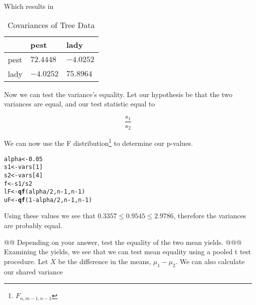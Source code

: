 \documentclass[10pt]{article}\usepackage[]{graphicx}\usepackage[]{xcolor}
\makeatletter
\newcommand{\hlnum}[1]{\textcolor[rgb]{0.686,0.059,0.569}{#1} }%
\newcommand{\hlopt}[1]{\textcolor[rgb]{0,0,0}{#1} }%
\newcommand{\hlstd}[1]{\textcolor[rgb]{0.345,0.345,0.345}{#1} }%
\newcommand{\hlkwb}[1]{\textcolor[rgb]{0.69,0.353,0.396}{#1} }%
\newcommand{\hlkwd}[1]{\textcolor[rgb]{0.737,0.353,0.396}{\textbf{#1} } }%
\newenvironment{kframe}{%
 \def\at@end@of@kframe{}%
 \ifinner\ifhmode%
  \def\at@end@of@kframe{\end{minipage} }%
  \begin{minipage}{\columnwidth}%
 \fi\fi%
 \def\FrameCommand##1{\hskip\@totalleftmargin \hskip-\fboxsep
 \colorbox{shadecolor}{##1}\hskip-\fboxsep
     \hskip-\linewidth \hskip-\@totalleftmargin \hskip\columnwidth}%
 \MakeFramed {\advance\hsize-\width
   \@totalleftmargin\z@ \linewidth\hsize
   \@setminipage} }%
 {\par\unskip\endMakeFramed%
 \at@end@of@kframe}
\newenvironment{knitrout}{}{} %
\makeatother
\begin{document}
\begin{easylist}[enumerate]
    Which results in

    \begin{table}[H]
        \centering
        \begin{tabular}{|l|l|l|}
            \hline
            & {\ttfamily pest} & {\ttfamily lady}\\
            \hline
            {\ttfamily pest} & $72.4448$ & $-4.0252$\\
            \hline
            {\ttfamily lady} & $-4.0252$ & $75.8964$\\
            \hline
        \end{tabular}
        \caption{Covariances of Tree Data}
        \label{table:treevars}
    \end{table}

    Now we can test the variance's equality. Let our hypothesis be that the two variances are equal, and our test
    statistic equal to

    \[
        \frac{s_1}{s_2}
    \]

    We can now use the F distribution\footnote{$ F_{\alpha, m - 1, n - 1} $} to determine our p-values.

\begin{knitrout}
\color{fgcolor}\begin{kframe}
\begin{alltt}
             \hlstd{alpha} \hlkwb{<-} \hlnum{0.05}
             \hlstd{s1} \hlkwb{<-} \hlstd{vars[}\hlnum{1}\hlstd{]}
             \hlstd{s2} \hlkwb{<-} \hlstd{vars[}\hlnum{4}\hlstd{]}
             \hlstd{f} \hlkwb{<-} \hlstd{s1} \hlopt{/} \hlstd{s2}
             \hlstd{lF} \hlkwb{<-} \hlkwd{qf}\hlstd{(alpha} \hlopt{/} \hlnum{2}\hlstd{, n} \hlopt{-} \hlnum{1}\hlstd{, n} \hlopt{-} \hlnum{1}\hlstd{)}
             \hlstd{uF} \hlkwb{<-} \hlkwd{qf}\hlstd{(}\hlnum{1} \hlopt{-} \hlstd{alpha} \hlopt{/} \hlnum{2}\hlstd{, n} \hlopt{-} \hlnum{1}\hlstd{, n} \hlopt{-} \hlnum{1}\hlstd{)}
\end{alltt}
\end{kframe}
\end{knitrout}


    Using these values we see that $0.3357 \le 0.9545 \le 2.9786$, therefore the variances are probably
    equal.

    @@ Depending on your answer, test the equality of the two mean yields.
    @@@ Examining the yields, we see that we can test mean equality using a pooled t test procedure. Let $X$ be the
    difference in the means, $\mu_1 - \mu_2$. We can also calculate our shared variance


\end{easylist}
\end{document}
